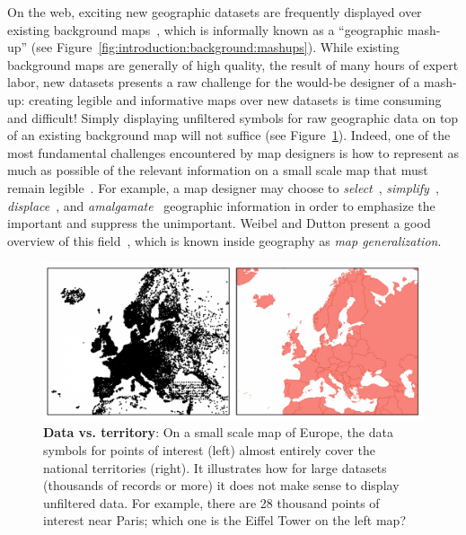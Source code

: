 \documentclass[11pt, oneside]{report}
\begin{document}
{On the web, exciting new geographic datasets are frequently displayed over existing background maps~\cite{google2014maps,stamen2014tiles}, which is informally known as a ``geographic mash-up'' (see Figure~\ref{fig:introduction:background:mashups}}). While existing background maps are generally of high quality, the result of many hours of expert labor, new datasets presents a raw challenge for the would-be designer of a mash-up: creating legible and informative maps over new datasets is time consuming and difficult! Simply displaying unfiltered symbols for raw geographic data on top of an existing background map will not suffice (see Figure~\ref{fig:raw:poi:data}). Indeed, one of the most fundamental challenges encountered by map designers is how to represent as much as possible of the relevant information on a small scale map that must remain legible~\cite{jones2005webage}. For example, a map designer may choose to \emph{select}~\cite{topfer1966principles}, \emph{simplify}~\cite{douglas1973algorithms},  \emph{displace}~\cite{lonergan2001iterative}, and \emph{amalgamate}~\cite{haunert2006landcover} geographic information in order to emphasize the important and suppress the unimportant. Weibel and Dutton present a good overview of this field~\cite{weibel1999generalising}, which is known inside geography as \emph{map generalization}.

\begin{figure}[htbp]
\begin{center}
\includegraphics[scale=.495]{figs-thesis/data-draws-the-world.pdf}
\caption{\textbf{Data vs. territory}: On a small scale map of Europe, the data symbols for points of interest (left) almost entirely cover the national territories (right). It illustrates how for large datasets (thousands of records or more) it does not make sense to display unfiltered data. For example, there are 28 thousand points of interest near Paris; which one is the Eiffel Tower on the left map?}
\label{fig:raw:poi:data}
\end{center}
\vspace*{-4ex}
\end{figure}
\end{document}
